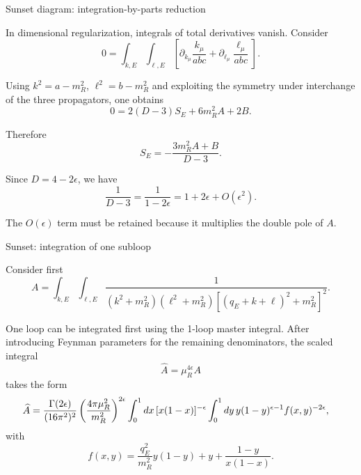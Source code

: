 \documentclass[aspectratio=169,10pt]{beamer}
\begin{document}
\begin{frame}{Sunset diagram: integration-by-parts reduction}

In dimensional regularization, integrals of total derivatives vanish.
Consider
\begin{equation}
0
=
\int_{k,E}\int_{\ell,E}
\left[
\partial_{k_\mu}
\frac{k_\mu}{abc}
+
\partial_{\ell_\mu}
\frac{\ell_\mu}{abc}
\right].
\end{equation}

Using $k^2=a-m_R^2$, $\ell^2=b-m_R^2$ and exploiting the symmetry under interchange of the three
propagators, one obtains
\begin{equation}
0
=
2(D-3)S_E
+
6m_R^2A
+
2B.
\end{equation}

Therefore
\begin{equation}
S_E
=
-\frac{3m_R^2A+B}{D-3}.
\end{equation}

Since $D=4-2\epsilon$, we have
\begin{equation}
\frac1{D-3}
=
\frac1{1-2\epsilon}
=
1+2\epsilon+O(\epsilon^2).
\end{equation}

The $O(\epsilon)$ term must be retained because it multiplies the
double pole of $A$.


\end{frame}


\begin{frame}{Sunset: integration of one subloop}

Consider first
\begin{equation}
A
=
\int_{k,E}\int_{\ell,E}
\frac1{
(k^2+m_R^2)
(\ell^2+m_R^2)
[(q_E+k+\ell)^2+m_R^2]^2
}.
\end{equation}

One loop can be integrated first using the 1-loop master integral.
After introducing Feynman parameters for the remaining denominators,
the scaled integral
\begin{equation}
\widehat A
=
\mu_R^{4\epsilon}A
\end{equation}
takes the form
\begin{align}
\widehat A
&=
\frac{\Gamma(2\epsilon)}{(16\pi^2)^2}
\left(
\frac{4\pi\mu_R^2}{m_R^2}
\right)^{2\epsilon}
\int_0^1dx\,[x(1-x)]^{-\epsilon}
\int_0^1dy\,
y(1-y)^{\epsilon-1}
f(x,y)^{-2\epsilon},
\end{align}
with
\begin{equation}
f(x,y)
=
\frac{q_E^2}{m_R^2}y(1-y)
+y
+\frac{1-y}{x(1-x)}.
\end{equation}

\end{frame}
\end{document}

